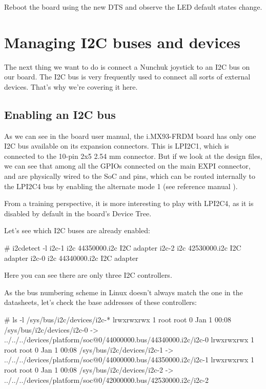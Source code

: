 Reboot the board using the new DTS and observe the LED default states
change.

\section{Managing I2C buses and devices}

The next thing we want to do is connect a Nunchuk joystick
to an I2C bus on our board. The I2C bus is very frequently used
to connect all sorts of external devices. That's why we're covering
it here.

\subsection{Enabling an I2C bus}

As we can see in the board user manual, the i.MX93-FRDM board has
only one I2C bus available on its expansion connectors. This is LPI2C1,
which is connected to the 10-pin 2x5 2.54 mm connector. But if we look
at the design files, we can see that among all the GPIOs connected on the main
EXPI connector,  and  are physically
wired to the SoC  and  pins, which can be routed
internally to the LPI2C4 bus by enabling the alternate mode 1 (see reference
manual ).

From a training perspective, it is more interesting to play with LPI2C4, as it
is disabled by default in the board's Device Tree.

Let's see which I2C buses are already enabled:

\begin{bashinput}
# i2cdetect -l
i2c-1	i2c       	44350000.i2c                    	I2C adapter
i2c-2	i2c       	42530000.i2c                    	I2C adapter
i2c-0	i2c       	44340000.i2c                    	I2C adapter

\end{bashinput}

Here you can see there are only three I2C controllers.

As the bus numbering scheme in Linux doesn't always match the one
in the datasheets, let's check the base addresses of these controllers:

\begin{bashinput}
# ls -l /sys/bus/i2c/devices/i2c-*
lrwxrwxrwx    1 root     root             0 Jan  1 00:08 /sys/bus/i2c/devices/i2c-0 -> ../../../devices/platform/soc@0/44000000.bus/44340000.i2c/i2c-0
lrwxrwxrwx    1 root     root             0 Jan  1 00:08 /sys/bus/i2c/devices/i2c-1 -> ../../../devices/platform/soc@0/44000000.bus/44350000.i2c/i2c-1
lrwxrwxrwx    1 root     root             0 Jan  1 00:08 /sys/bus/i2c/devices/i2c-2 -> ../../../devices/platform/soc@0/42000000.bus/42530000.i2c/i2c-2

\end{bashinput}

